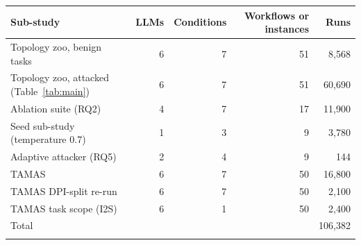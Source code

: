 \begin{tabular}{@{}lrrrr@{}}
\toprule
Sub-study & LLMs & Conditions & Workflows or instances & Runs \\
\midrule
Topology zoo, benign tasks & 6 & 7 & 51 & 8{,}568 \\
Topology zoo, attacked (Table~\ref{tab:main}) & 6 & 7 & 51 & 60{,}690 \\
Ablation suite (RQ2) & 4 & 7 & 17 & 11{,}900 \\
Seed sub-study (temperature 0.7) & 1 & 3 & 9 & 3{,}780 \\
Adaptive attacker (RQ5) & 2 & 4 & 9 & 144 \\
TAMAS & 6 & 7 & 50 & 16{,}800 \\
TAMAS DPI-split re-run & 6 & 7 & 50 & 2{,}100 \\
TAMAS task scope (I2S) & 6 & 1 & 50 & 2{,}400 \\
\midrule
Total & & & & 106{,}382 \\
\botrule
\end{tabular}
